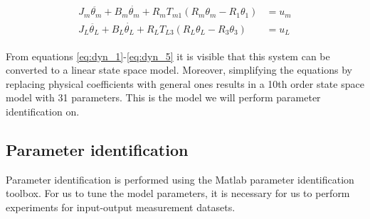 \documentclass[conference]{IEEEtran}
\begin{document}
\begin{gather}
\begin{align}
J_m\ddot{{\theta}_m} + B_m \dot{{\theta}_m} + R_m T_{m1}(R_m {\theta}_m - R_1 {\theta}_1) &= u_m\\
J_L\ddot{{\theta}_L} + B_L \dot{{\theta}_L} + R_L T_{L3}(R_L {\theta}_L - R_3 {\theta}_3) &= u_L
\end{align}
\end{gather}





From equations \ref{eq:dyn_1}-\ref{eq:dyn_5} it is visible that this system can be converted to a linear state space model.
Moreover, simplifying the equations by replacing physical coefficients with general ones results in a 10th order state space model with 31 parameters.
This is the model we will perform parameter identification on.

\subsection{Parameter identification}
Parameter identification is performed using the Matlab parameter identification toolbox.
For us to tune the model parameters, it is necessary for us to perform experiments for input-output measurement datasets.
\end{document}
